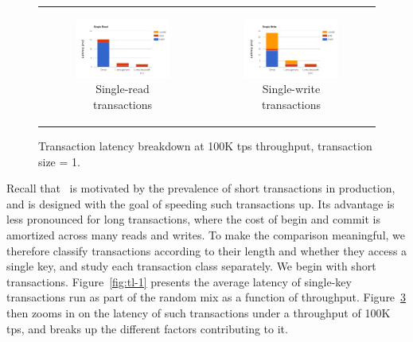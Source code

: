 \begin{figure}[tb]
\centering  
\begin{tabular}{cc}
      \begin{subfigure}[t]{0.5\textwidth}
	\includegraphics[width=.9\textwidth]{figs/stack-brc.png}
    \caption[]{Single-read transactions}
    \label{fig:stack-brc}
  \end{subfigure} &

  \begin{subfigure}[t]{0.5\textwidth}
	\includegraphics[width=.9\textwidth]{figs/stack-bwc.png}
    \caption[]{Single-write transactions}
    \label{fig:stack-bwc}
  \end{subfigure}
  \end{tabular}
\caption{Transaction latency breakdown at 100K tps throughput, transaction size = 1.} 
\label{fig:1key-break}
\end{figure}


Recall that \sys\ is motivated by the prevalence of short transactions in production, and is designed with
the goal of speeding such transactions up.
Its advantage is less pronounced for long transactions, where the cost of begin and commit is amortized
across many reads and writes.
To make the comparison meaningful, we therefore classify transactions according to their length and whether they
access a single key, and study each transaction class separately. 
We begin with short transactions. 
Figure~\ref{fig:tl-1} presents the average latency of single-key transactions run as part of the random mix
as a function of  throughput.
Figure~\ref{fig:1key-break} then zooms in on the latency of such transactions under a throughput of 100K tps,
and breaks up the different factors contributing to it. 

